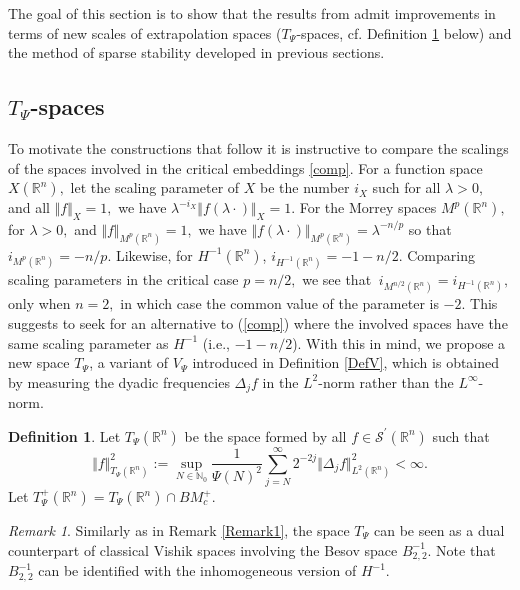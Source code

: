 \documentclass[11pt, a4paper,leqno]{amsart}
\theoremstyle{plain}
\numberwithin{equation}{section}
\theoremstyle{definition}
\newtheorem{definition}{Definition}
\theoremstyle{remark}
\newtheorem{remark}{Remark}
\def\R{\mathbb{R}}
\begin{document}
The goal of this section is to show that the results from \cite{Tadmor} admit improvements in terms of new scales of extrapolation spaces ($T_\Psi$-spaces, cf. Definition \ref{DefTPsi} below) and the method of sparse stability developed in previous sections. 

\subsection{$T_\Psi$-spaces}\label{Sub81}
To motivate the constructions that follow it is instructive to compare the
scalings of the spaces involved in the critical embeddings \eqref{comp}. For a function
space $X(\mathbb{R}^{n}),$ let the scaling parameter of $X$ be the number
$i_{X}$ such for all $\lambda>0,$ and all $\Vert f\Vert_{X}=1,$ we have
$\lambda^{-i_{X}}\Vert f(\lambda\cdot)\Vert_{X}=1.$ For the Morrey spaces
$M^{p}(\mathbb{R}^{n}),$ for $\lambda>0,$ and $\Vert f\Vert_{M^{p}%
(\mathbb{R}^{n})}=1,$ we have $\Vert f(\lambda\cdot)\Vert_{M^{p}%
(\mathbb{R}^{n})}=\lambda^{-n/p}$ so that $i_{M^{p}(\mathbb{R}^{n})}=-n/p.$
Likewise, for $H^{-1}(\mathbb{R}^{n})$, $i_{H^{-1}(\mathbb{R}^{n})}=-1-n/2.$
Comparing scaling parameters in the critical case $p=n/2,$ we see that
$\ i_{M^{n/2}(\mathbb{R}^{n})}=i_{H^{-1}(\mathbb{R}^{n})},$ only when $n=2,$
in which case the common value of the parameter is $-2.$ This suggests to seek
for an alternative to (\ref{comp}) where the involved
spaces have the same scaling parameter as $H^{-1}$ (i.e., $-1-n/2$). With this
in mind, we propose a new space $T_{\Psi}$, a variant of $V_{\Psi}$ introduced in Definition \ref{DefV}, which is
obtained by measuring the dyadic frequencies $\Delta_{j}f$ in the $L^{2}$-norm
rather than the $L^{\infty}$-norm.

\begin{definition}\label{DefTPsi}
Let $T_{\Psi}(\mathbb{R}^{n})$ be the space formed by all $f\in\mathcal{S}%
^{\prime}(\mathbb{R}^{n})$ such that
\[
\Vert f\Vert_{T_{\Psi}(\mathbb{R}^{n})}^{2}:=\sup_{N\in\mathbb{N}_{0}}\frac
{1}{\Psi(N)^{2}}\sum_{j=N}^{\infty}2^{-2j}\Vert\Delta_{j}f\Vert_{L^{2}%
(\mathbb{R}^{n})}^{2} < \infty. 
\]
Let $T^+_\Psi(\R^n) = T_\Psi(\R^n) \cap BM^+_c$. 
\end{definition}

\begin{remark}
	Similarly as in Remark  \ref{Remark1}, the space $T_\Psi$ can be seen as a dual counterpart of classical Vishik spaces involving the Besov space $B^{-1}_{2, 2}$. Note that $B^{-1}_{2, 2}$ can be identified with the inhomogeneous version of $H^{-1}$. 
\end{remark}
\end{document}
